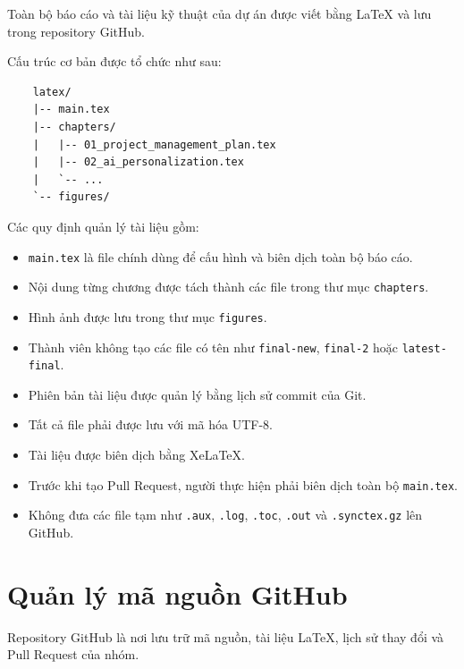 Toàn bộ báo cáo và tài liệu kỹ thuật của dự án được viết bằng LaTeX và
lưu trong repository GitHub.

Cấu trúc cơ bản được tổ chức như sau:

\begin{verbatim}
	latex/
	|-- main.tex
	|-- chapters/
	|   |-- 01_project_management_plan.tex
	|   |-- 02_ai_personalization.tex
	|   `-- ...
	`-- figures/
\end{verbatim}

Các quy định quản lý tài liệu gồm:

\begin{itemize}
	\item \texttt{main.tex} là file chính dùng để cấu hình và biên dịch
	toàn bộ báo cáo.
	
	\item Nội dung từng chương được tách thành các file trong thư mục
	\texttt{chapters}.
	
	\item Hình ảnh được lưu trong thư mục \texttt{figures}.
	
	\item Thành viên không tạo các file có tên như
	\texttt{final-new}, \texttt{final-2} hoặc \texttt{latest-final}.
	
	\item Phiên bản tài liệu được quản lý bằng lịch sử commit của Git.
	
	\item Tất cả file phải được lưu với mã hóa UTF-8.
	
	\item Tài liệu được biên dịch bằng XeLaTeX.
	
	\item Trước khi tạo Pull Request, người thực hiện phải biên dịch
	toàn bộ \texttt{main.tex}.
	
	\item Không đưa các file tạm như \texttt{.aux}, \texttt{.log},
	\texttt{.toc}, \texttt{.out} và \texttt{.synctex.gz} lên GitHub.
\end{itemize}

\section{Quản lý mã nguồn GitHub}

Repository GitHub là nơi lưu trữ mã nguồn, tài liệu LaTeX, lịch sử thay
đổi và Pull Request của nhóm.

